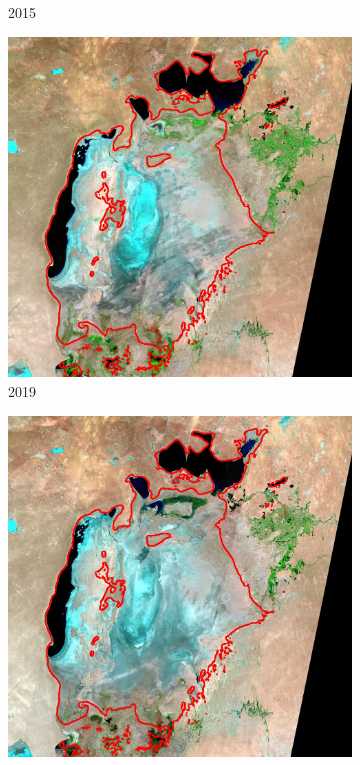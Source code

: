 \documentclass[12pt,a4paper]{article}
\begin{document}
\begin{figure}[H]
\begin{subfigure}[b]{0.19\textwidth}
        \caption{2015}
    \end{subfigure}
    \begin{subfigure}[b]{0.19\textwidth}
        \centering
        \includegraphics[width=\textwidth]{../img/2019o.jpg}
        \caption{2019}
    \end{subfigure}
    \begin{subfigure}[b]{0.19\textwidth}
        \centering
        \includegraphics[width=\textwidth]{../img/2021o.jpg}

\end{subfigure}
\end{figure}
\end{document}
